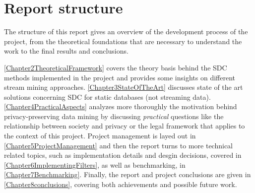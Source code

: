 \section{Report structure}
\label{Introduction::Structure}

The structure of this report gives an overview of the development process of the project, from the theoretical foundations that are necessary to understand the work to the final results and conclusions.

\cref{Chapter2TheoreticalFramework} covers the theory basis behind the SDC methods implemented in the project and provides some insights on different stream mining approaches. \cref{Chapter3StateOfTheArt} discusses state of the art solutions concerning SDC for static databases (not streaming data). \cref{Chapter4PracticalAspects} analyzes more thoroughly the motivation behind privacy-preserving data mining by discussing \textit{practical} questions like the relationship between society and privacy or the legal framework that applies to the context of this project. Project management is layed out in \cref{Chapter5ProjectManagement} and then the report turns to more technical related topics, such as implementation details and desgin decisions, covered in \cref{Chapter6ImplementingFilters}, as well as benchmarking, in \cref{Chapter7Benchmarking}. Finally, the report and project conclusions are given in \cref{Chapter8conclusions}, covering both achievements and possible future work.
